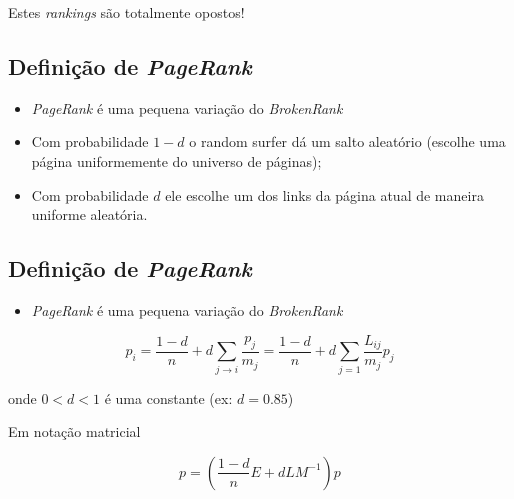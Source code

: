 \documentclass[
  letterpaper,
  DIV=11,
  numbers=noendperiod]{scrartcl}
\providecommand{\tightlist}{%
  \setlength{\itemsep}{0pt}\setlength{\parskip}{0pt}}\usepackage{longtable,booktabs,array}
\begin{document}
\begin{tcolorbox}[enhanced jigsaw, colbacktitle=quarto-callout-important-color!10!white, colframe=quarto-callout-important-color-frame, opacityback=0, breakable, toprule=.15mm, leftrule=.75mm, titlerule=0mm, coltitle=black, bottomtitle=1mm, colback=white, toptitle=1mm, title=\textcolor{quarto-callout-important-color}{\faExclamation}\hspace{0.5em}{Important}, arc=.35mm, rightrule=.15mm, bottomrule=.15mm, left=2mm, opacitybacktitle=0.6]
Estes \emph{rankings} são totalmente opostos!
\end{tcolorbox}

\hypertarget{definiuxe7uxe3o-de-pagerank}{%
\subsection{\texorpdfstring{Definição de
\emph{PageRank}}{Definição de PageRank}}\label{definiuxe7uxe3o-de-pagerank}}

\begin{itemize}
\item
  \emph{PageRank} é uma pequena variação do \emph{BrokenRank}
\item
  Com probabilidade \(1-d\) o random surfer dá um salto aleatório
  (escolhe uma página uniformemente do universo de páginas);
\item
  Com probabilidade \(d\) ele escolhe um dos links da página atual de
  maneira uniforme aleatória.
\end{itemize}

\hypertarget{definiuxe7uxe3o-de-pagerank-1}{%
\subsection{\texorpdfstring{Definição de
\emph{PageRank}}{Definição de PageRank}}\label{definiuxe7uxe3o-de-pagerank-1}}

\begin{itemize}
\tightlist
\item
  \emph{PageRank} é uma pequena variação do \emph{BrokenRank}
\end{itemize}

\[ p_i = \frac{1-d}{n} + d\sum_{j\rightarrow i} \frac{p_j}{m_j} = \frac{1-d}{n} + d\sum_{j=1}\frac{L_{ij}}{m_j}p_j\]

onde \(0<d<1\) é uma constante (ex: \(d=0.85\))

Em notação matricial

\[ p =  \left( \frac{1-d}{n}E + dLM^{-1}\right)p\]
\end{document}

